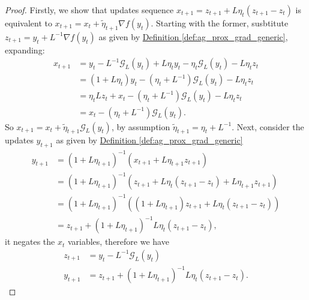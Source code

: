 \documentclass[12pt]{article}
\begin{document}
        \begin{proof}
            Firstly, we show that updates sequence $x_{t + 1} = z_{t + 1} + L\eta_t (z_{t + 1} - z_t)$ is equivalent to $x_{t + 1} = x_t + \tilde\eta_{t + 1}\nabla f(y_t)$. 
            Starting with the former, susbtitute $z_{t + 1} = y_t + L^{-1}\nabla f(y_t)$ as given by 
            \hyperref[def:ag_prox_grad_generic]{Definition \ref*{def:ag_prox_grad_generic}},
            expanding: 
            \begin{align*}
                x_{t + 1} &= y_t - L^{-1}\mathcal G_L(y_t) 
                + L \eta_t y_t - \eta_t \mathcal G_L(y_t) - L\eta_t z_t
                \\
                &= 
                (1 + L\eta_t)y_t - (\eta_t + L^{-1})\mathcal G_L(y_t) - L\eta_t z_t
                \\
                &= \eta_t Lz_t + x_t -(\eta_t + L^{-1}) \mathcal G_L(y_t)  - L\eta_t z_t
                \\
                &= x_t - (\eta_t + L^{-1})\mathcal G_L(y_t). 
            \end{align*}
            So $x_{t + 1} = x_t + \tilde \eta_{t + 1}\mathcal G_L(y_t)$, by assumption $\tilde \eta_{t + 1} = \eta_t + L^{-1}$. 
            Next, consider the updates $y_{t + 1}$ as given by 
            \hyperref[def:ag_prox_grad_generic]{Definition \ref*{def:ag_prox_grad_generic}}
            \begin{align*}
                y_{t + 1} &= (1 + L\eta_{t + 1})^{-1} (x_{t + 1} + L\eta_{t + 1}z_{t + 1})
                \\
                &= (1 + L\eta_{t + 1})^{-1} (
                    z_{t + 1} + L\eta_t (z_{t + 1} - z_t) + L\eta_{t + 1} z_{t + 1}
                )
                \\
                &= 
                (1 + L\eta_{t + 1})^{-1} (
                    (1 + L\eta_{t + 1})z_{t + 1} + L\eta_t(z_{t + 1} - z_t)
                )
                \\
                &= z_{t + 1} + (1 + L\eta_{t + 1})^{-1}L\eta_t (z_{t + 1} - z_t), 
            \end{align*}
            it negates the $x_t$ variables, therefore we have 
            \begin{align*}
                z_{t + 1} &= y_t - L^{-1} \mathcal G_L (y_t)
                \\
                y_{t + 1} &= z_{t + 1} + (1 + L\eta_{t + 1})^{-1}L\eta_t (z_{t + 1} - z_t).
            \end{align*}

\end{proof}
\end{document}
